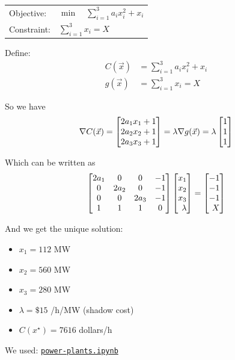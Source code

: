 \begin{solution}
\begin{slide}

\begin{parts}
\setcounter{partsitem}{2}
	\item 	
		\begin{tabular}[t]{ll}
			Objective: 	& $\displaystyle \min \quad \sum_{i=1}^3 a_i x_i^2 + x_i$ \\
			Constraint: & $\displaystyle \sum_{i=1}^3 x_i = X$
		\end{tabular}

	\item Define:
		\begin{align*}
			C(\vec{x}) & = \sum_{i=1}^3 a_i x_i^2 + x_i \\
			g(\vec{x}) & = \sum_{i=1}^3 x_i = X
		\end{align*}
		
		So we have
		\[
			\nabla C (\vec{x}) 
				= \mat{2a_1 x_1 + 1\\2a_2 x_2 + 1\\2a_3 x_3 + 1} 
				= \lambda	\nabla g (\vec{x}) 
				= \lambda \mat{1\\1\\1}
		\]
		
		Which can be written as
		\[ \matc{2a_1 & 0 & 0 & -1\\0 & 2a_2 & 0 & -1\\0 & 0 & 2a_3 & -1 \\ 1 & 1 & 1 & 0} \mat{x_1\\x_2\\x_3\\\lambda} = \mat{-1\\-1\\-1\\ X}
		\]
		
		And we get the unique solution:
		\begin{itemize}
			\item $x_1 = 112$ MW
			\item $x_2 = 560$ MW
			\item $x_3 = 280$ MW
			\item $\lambda = \$15$ /h/MW (shadow cost)
			\item $C(x^\star) = 7616$ dollars/h
		\end{itemize}
		
		We used: \href{https://utoronto.syzygy.ca/jupyter/user-redirect/git-pull?repo=https://github.com/bigfatbernie/IBLMathModeling&subPath=book/python/power-plants.ipynb}{\tt power-plants.ipynb}
		

\end{parts}
\end{slide}
\end{solution}
